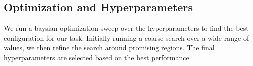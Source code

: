 \subsection{Optimization and Hyperparameters}
We run a baysian optimization sweep over the hyperparameters to find the best configuration for our task. Initially running a coarse search over a wide range of values, we then refine the search around promising regions. The final hyperparameters are selected based on the best performance.


